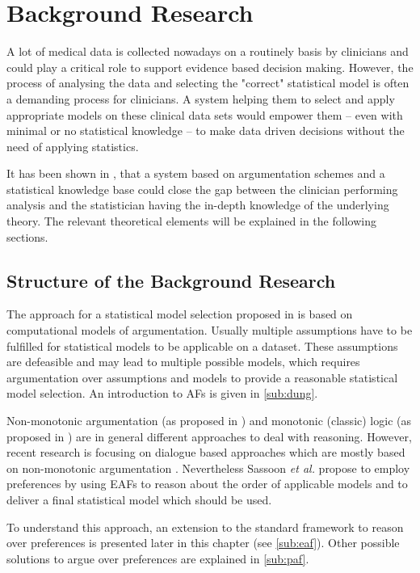 \section{Background Research}
\label{sec:background}

A lot of medical data is collected nowadays on a routinely basis by clinicians and could play a critical role to support evidence based decision making. However, the process of analysing the data and selecting the "correct" statistical model is often a demanding process for clinicians. A system helping them to select and apply appropriate models on these clinical data sets would empower them -- even with minimal or no statistical knowledge -- to make data driven decisions without the need of applying statistics. 

It has been shown in \cite{sassoon2014}, that a system based on argumentation schemes and a statistical knowledge base could close the gap between the clinician performing analysis and the statistician having the in-depth knowledge of the underlying theory. The relevant theoretical elements will be explained in the following sections.


\subsection{Structure of the Background Research}

The approach for a statistical model selection proposed in \cite{sassoon2014} is based on computational models of argumentation. Usually multiple assumptions have to be fulfilled for statistical models to be applicable on a dataset. These assumptions are defeasible and may lead to multiple possible models, which requires argumentation over assumptions and models to provide a reasonable statistical model selection. An introduction to \glspl{AF} is given in \autoref{sub:dung}. 

Non-monotonic argumentation (as proposed in \cite{liao,dung1995}) and monotonic (classic) logic (as proposed in \cite{Reiter1980}) are in general different approaches to deal with reasoning. However, recent research is focusing on dialogue based approaches which are mostly based on non-monotonic argumentation \cite{parsons2000,Walton1995}. 
Nevertheless Sassoon \textit{et al.} propose to employ preferences by using \glspl{EAF} to reason about the order of applicable models and to deliver a final statistical model which should be used. 

To understand this approach, an extension to the standard framework to reason over preferences is presented later in this chapter (see \autoref{sub:eaf}). Other possible solutions to argue over preferences are explained in \autoref{sub:paf}.

